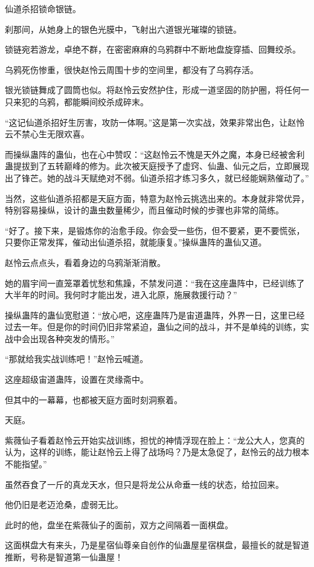 \begin{this_body}
仙道杀招锁命银链。

刹那间，从她身上的银色光膜中，飞射出六道银光璀璨的锁链。

锁链宛若游龙，卓绝不群，在密密麻麻的乌鸦群中不断地盘旋穿插、回舞绞杀。

乌鸦死伤惨重，很快赵怜云周围十步的空间里，都没有了乌鸦存活。

银光锁链舞成了圆筒也似。将赵怜云安然护住，形成一道坚固的防护圈，将任何一只来犯的乌鸦，都能瞬间绞杀成碎末。

“这记仙道杀招好生厉害，攻防一体啊。”这是第一次实战，效果非常出色，让赵怜云不禁心生无限欢喜。

而操纵蛊阵的蛊仙，也在心中赞叹：“这赵怜云不愧是天外之魔，本身已经被舍利蛊提拔到了五转巅峰的修为。此次被天庭授予了虚窍、仙蛊、仙元之后，立即展现出了锋芒。她的战斗天赋绝对不弱。仙道杀招才练习多久，就已经能娴熟催动了。”

当然，这些仙道杀招都是天庭方面，特意为赵怜云挑选出来的。本身就非常优异，特别容易操纵，设计的蛊虫数量稀少，而且催动时候的步骤也非常的简练。

“好了。接下来，是锻炼你的治愈手段。你会受一些伤，但不要紧，更不要慌张，只要你正常发挥，催动出仙道杀招，就能康复。”操纵蛊阵的蛊仙又道。

赵怜云点点头，看着身边的乌鸦渐渐消散。

她的眉宇间一直笼罩着忧愁和焦躁，不禁发问道：“我在这座蛊阵中，已经训练了大半年的时间。我何时才能出发，进入北原，施展救援行动？”

操纵蛊阵的蛊仙宽慰道：“放心吧，这座蛊阵乃是宙道蛊阵，外界一日，这里已经过去一年。但是你的时间仍旧非常紧迫，蛊仙之间的战斗，并不是单纯的训练，实战中会出现各种突发的情形。”

“那就给我实战训练吧！”赵怜云喊道。

这座超级宙道蛊阵，设置在灵缘斋中。

但其中的一幕幕，也都被天庭方面时刻洞察着。

天庭。

紫薇仙子看着赵怜云开始实战训练，担忧的神情浮现在脸上：“龙公大人，您真的认为，这样的训练，能让赵怜云上得了战场吗？乃是太急促了，赵怜云的战力根本不能指望。”

虽然吞食了一斤的真龙天水，但只是将龙公从命垂一线的状态，给拉回来。

他仍旧是老迈沧桑，虚弱无比。

此时的他，盘坐在紫薇仙子的面前，双方之间隔着一面棋盘。

这面棋盘大有来头，乃是星宿仙尊亲自创作的仙蛊屋星宿棋盘，最擅长的就是智道推断，号称是智道第一仙蛊屋！


\end{this_body}
